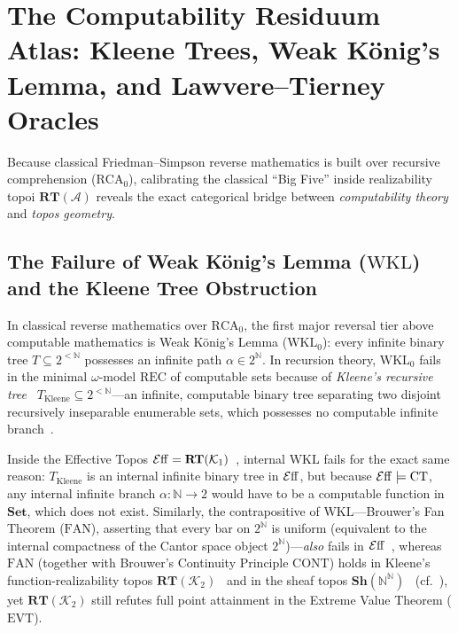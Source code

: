 \section{The Computability Residuum Atlas: Kleene Trees, Weak König's Lemma, and Lawvere--Tierney Oracles}\label{sec:ltt-topologies}

Because classical Friedman--Simpson reverse mathematics is built over recursive comprehension ($\mathrm{RCA}_0$), calibrating the classical ``Big Five'' inside realizability topoi $\mathbf{RT}(\mathcal{A})$ reveals the exact categorical bridge between \emph{computability theory} and \emph{topos geometry}.

\subsection{The Failure of Weak König's Lemma ($\mathrm{WKL}$) and the Kleene Tree Obstruction}

In classical reverse mathematics over $\mathrm{RCA}_0$, the first major reversal tier above computable mathematics is Weak König's Lemma ($\mathrm{WKL}_0$): every infinite binary tree $T \subseteq 2^{<\mathbb{N}}$ possesses an infinite path $\alpha \in 2^{\mathbb{N}}$. In recursion theory, $\mathrm{WKL}_0$ fails in the minimal $\omega$-model $\mathrm{REC}$ of computable sets because of \emph{Kleene's recursive tree}~\cite{Kleene52} $T_{\mathrm{Kleene}} \subseteq 2^{<\mathbb{N}}$---an infinite, computable binary tree separating two disjoint recursively inseparable enumerable sets, which possesses no computable infinite branch~\cite[\S IV.1, \S VIII.2]{Simpson09}.

Inside the Effective Topos $\mathcal{E}\mathrm{ff} = \mathbf{RT}(\mathcal{K}_1)$~\cite{Hyland82}, internal $\mathrm{WKL}$ fails for the exact same reason: $T_{\mathrm{Kleene}}$ is an internal infinite binary tree in $\mathcal{E}\mathrm{ff}$, but because $\mathcal{E}\mathrm{ff} \models \mathrm{CT}$, any internal infinite branch $\alpha: \mathbb{N} \to 2$ would have to be a computable function in $\mathbf{Set}$, which does not exist. Similarly, the contrapositive of $\mathrm{WKL}$---Brouwer's Fan Theorem ($\mathrm{FAN}$), asserting that every bar on $2^{\mathbb{N}}$ is uniform (equivalent to the internal compactness of the Cantor space object $2^{\mathbb{N}}$)---\emph{also} fails in $\mathcal{E}\mathrm{ff}$~\cite[\S 3.2]{vanOosten08}, whereas $\mathrm{FAN}$ (together with Brouwer's Continuity Principle $\mathrm{CONT}$) holds in Kleene's function-realizability topos $\mathbf{RT}(\mathcal{K}_2)$~\cite[\S 4.3]{vanOosten08} and in the sheaf topos $\mathbf{Sh}(\mathbb{N}^\mathbb{N})$~\cite[Theorem~3.2]{FourmanHyland79} (cf.~\cite{LietzStreicher12}), yet $\mathbf{RT}(\mathcal{K}_2)$ still refutes full point attainment in the Extreme Value Theorem ($\mathrm{EVT}$).

